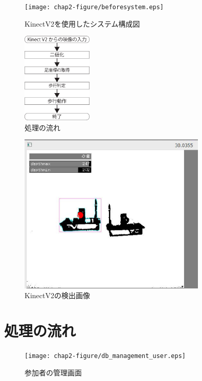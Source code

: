 \begin{figure}[tbp]
	\centering
			\texttt{[image: chap2-figure/beforesystem.eps]}
	\caption{KinectV2を使用したシステム構成図}
	\label{fig:beforesystemarc}
\end{figure}

\begin{figure}[tbp]
	\centering
			\includegraphics[width=0.3\textwidth]{chap2-figure/katagiri1.eps}
	\caption{処理の流れ}
	\label{fig:片桐1}
\end{figure}

\begin{figure}[tbp]
	\centering
			\includegraphics[width=0.8\textwidth]{chap2-figure/kinectsystem.eps}
	\caption{KinectV2の検出画像}
	\label{fig:kinectsystemarc}
\end{figure}
\fi

\section{処理の流れ}

\begin{figure}[tbp]
	\centering
			\texttt{[image: chap2-figure/db\_management\_user.eps]}
	\caption{参加者の管理画面}
	\label{fig:db_management_user}
\end{figure}

